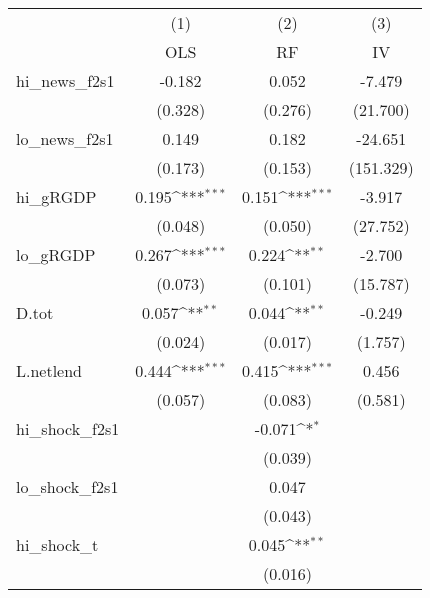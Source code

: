 {
\def\sym#1{\ifmmode^{#1}\else\(^{#1}\)\fi}
\begin{tabular}{l*{3}{c}}
\toprule
            &\multicolumn{1}{c}{(1)}&\multicolumn{1}{c}{(2)}&\multicolumn{1}{c}{(3)}\\
            &\multicolumn{1}{c}{OLS}&\multicolumn{1}{c}{RF}&\multicolumn{1}{c}{IV}\\
\midrule
hi\_news\_f2s1&      -0.182         &       0.052         &      -7.479         \\
            &     (0.328)         &     (0.276)         &    (21.700)         \\
\addlinespace
lo\_news\_f2s1&       0.149         &       0.182         &     -24.651         \\
            &     (0.173)         &     (0.153)         &   (151.329)         \\
\addlinespace
hi\_gRGDP    &       0.195\sym{***}&       0.151\sym{***}&      -3.917         \\
            &     (0.048)         &     (0.050)         &    (27.752)         \\
\addlinespace
lo\_gRGDP    &       0.267\sym{***}&       0.224\sym{**} &      -2.700         \\
            &     (0.073)         &     (0.101)         &    (15.787)         \\
\addlinespace
D.tot       &       0.057\sym{**} &       0.044\sym{**} &      -0.249         \\
            &     (0.024)         &     (0.017)         &     (1.757)         \\
\addlinespace
L.netlend   &       0.444\sym{***}&       0.415\sym{***}&       0.456         \\
            &     (0.057)         &     (0.083)         &     (0.581)         \\
\addlinespace
hi\_shock\_f2s1&                     &      -0.071\sym{*}  &                     \\
            &                     &     (0.039)         &                     \\
\addlinespace
lo\_shock\_f2s1&                     &       0.047         &                     \\
            &                     &     (0.043)         &                     \\
\addlinespace
hi\_shock\_t  &                     &       0.045\sym{**} &                     \\
            &                     &     (0.016)         &                     \\

\end{tabular}}
